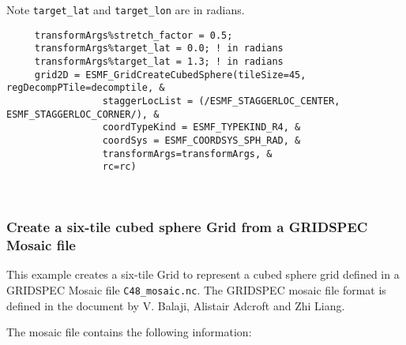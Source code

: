    Note {\tt target\_lat} and {\tt target\_lon} are in radians. 

 \begin{verbatim}
     transformArgs%stretch_factor = 0.5;
     transformArgs%target_lat = 0.0; ! in radians
     transformArgs%target_lat = 1.3; ! in radians
     grid2D = ESMF_GridCreateCubedSphere(tileSize=45, regDecompPTile=decomptile, &
                 staggerLocList = (/ESMF_STAGGERLOC_CENTER, ESMF_STAGGERLOC_CORNER/), &
                 coordTypeKind = ESMF_TYPEKIND_R4, &
                 coordSys = ESMF_COORDSYS_SPH_RAD, &
                 transformArgs=transformArgs, &
                 rc=rc)

 
\end{verbatim}
 

  \subsubsection{Create a six-tile cubed sphere Grid from a GRIDSPEC Mosaic file}
  \label{sec:usage:cubedspherefromfile}
  
  This example creates a six-tile Grid to represent a cubed sphere grid defined
  in a GRIDSPEC Mosaic file {\tt C48\_mosaic.nc}. The GRIDSPEC mosaic file format is defined in
  the document  by V. Balaji, Alistair Adcroft and Zhi Liang.
  
  The mosaic file contains the following information:
  

